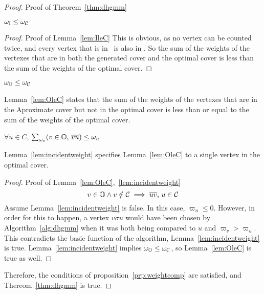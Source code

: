 \begin{proof}{Proof of Theorem~\ref{thm:dhgmm}}
  \begin{lem}
    $\omega_{{\mathbb I}} \le \omega_{{\mathcal C}}$
    \label{lem:IleC}
  \end{lem}
  \begin{proof}{Proof of Lemma~\ref{lem:IleC}}
    This is obvious, as no vertex can be counted twice, and every vertex that is in \bId\ is also in \cCd. So the sum of the weights of the vertexes that are in both the generated cover and the optimal cover is less than the sum of the weights of the optimal cover.
  \end{proof}
  \begin{lem}
    $\omega_{{\mathbb O}} \le \omega_{{\mathcal C}}$
    \label{lem:OleC}
  \end{lem}
  \begin{note}
    Lemma~\ref{lem:OleC} states that the sum of the weights of the vertexes that are in the Aproximate cover but not in the optimal cover is less than or equal to the sum of the weights of the optimal cover.
  \end{note}
  \begin{lem}
    $\forall u \in C$, $\sum_{\omega_v} (v \in {\mathbb O}\text{, }\overline{vu}) \le \omega_u$
    \label{lem:incidentweight}
  \end{lem}
  \begin{note}
    Lemma~\ref{lem:incidentweight} specifies Lemma~\ref{lem:OleC} to a single vertex in the optimal cover. 
  \end{note} 
  \begin{proof}{Proof of Lemma~\ref{lem:OleC},~\ref{lem:incidentweight}}
    \begin{equation}
      v \in {\mathbb O} \land v \notin {\mathcal C} \implies \overline{uv} \text{, } u \in {\mathcal C}
    \end{equation}
    Assume Lemma~\ref{lem:incidentweight} is false. In this case, $\varpi_u \le 0$. However, in order for this to happen, a vertex $v\sigma u$ would have been chosen by Algorithm~\ref{alg:dhgmm} when it was both being compared to $u$ and $\varpi_v > \varpi_u$. This contradicts the basic function of the algorithm, Lemma~\ref{lem:incidentweight} is true.
    Lemma~\ref{lem:incidentweight} implies $\omega_{{\mathbb O}} \le \omega_{{\mathcal C}}$, so Lemma~\ref{lem:OleC} is true as well.
  \end{proof}
        
  Therefore, the conditions of proposition~\ref{prp:weightcomp} are satisfied, and Thereom~\ref{thm:dhgmm} is true.
\end{proof}
